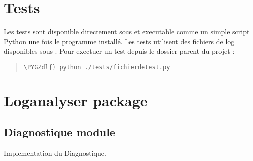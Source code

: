\documentclass[letterpaper,10pt,english]{sphinxmanual}
\def\PYGZdl{\char`\$}
\begin{document}
\section{Tests}
\label{tests::doc}\label{tests:tests}
Les tests sont disponible directement sous  et executable comme un simple script Python une fois le programme
installé. Les tests utilisent des fichiers de log disponibles sous . Pour exectuer un test depuis le
dossier parent du projet :
\begin{quote}

\begin{Verbatim}[commandchars=\\\{\}]
\PYGZdl{} python ./tests/fichierdetest.py
\end{Verbatim}
\end{quote}


\section{Loganalyser package}
\label{loganalyser::doc}\label{loganalyser:loganalyser-package}

\subsection{Diagnostique module}
\label{loganalyser:diagnostique-module}\label{loganalyser:module-loganalyser.diagnostique}
Implementation du Diagnostique.
\end{document}
